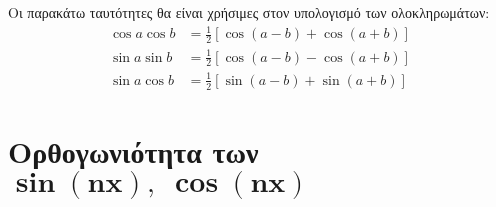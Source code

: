 \begin{rem}
  Οι παρακάτω ταυτότητες θα είναι χρήσιμες στον υπολογισμό των ολοκληρωμάτων:
  \begin{align*}
    \cos{a} \cos{b} &= \frac{1}{2} [\cos{(a-b)} + \cos{(a+b)}] \\ 
    \sin{a} \sin{b} &= \frac{1}{2} [\cos{(a-b)} - \cos{(a+b)}] \\
    \sin{a} \cos{b} &= \frac{1}{2} [\sin{(a-b)} + \sin{(a+b)}]
  \end{align*} 
\end{rem}


\section*{Ορθογωνιότητα των \ensuremath{\boldsymbol {\sin{(nx)}, \; \cos{(nx)}}}}

